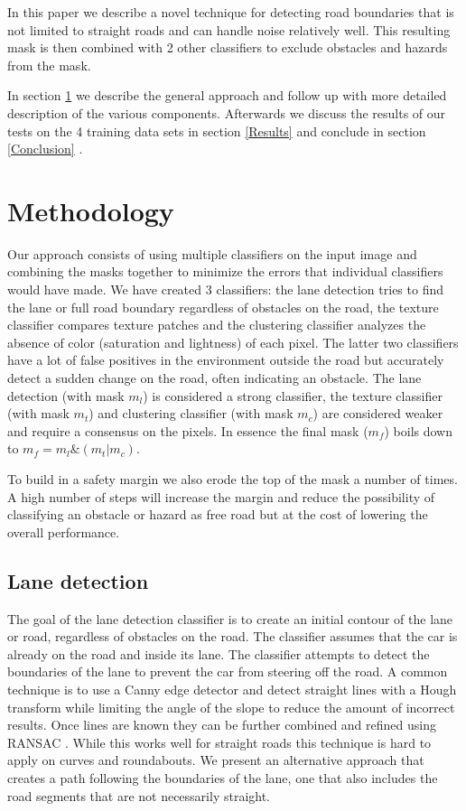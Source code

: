 \documentclass[oneside,english]{llncs}
\begin{document}
In this paper we describe a novel technique for detecting road boundaries that is not limited to straight roads and can handle noise relatively well. This resulting mask is then combined with 2 other classifiers to exclude obstacles and hazards from the mask.

In section \ref{Methodology}  we describe the general approach and follow up with more detailed description of the various components. Afterwards we discuss the results of our tests on the 4 training data sets in section \ref{Results}  and conclude in section \ref{Conclusion} .

\section{Methodology}\label{Methodology}

Our approach consists of using multiple classifiers on the input image and combining the masks together to minimize the errors that individual classifiers would have made. We have created 3 classifiers: the lane detection tries to find the lane or full road boundary regardless of obstacles on the road, the texture classifier compares texture patches and the clustering classifier analyzes the absence of color (saturation and lightness) of each pixel. The latter two classifiers have a lot of false positives in the environment outside the road but accurately detect a sudden change on the road, often indicating an obstacle. The lane detection (with mask $m_{l}$) is considered a strong classifier, the texture classifier (with mask $m_{t}$) and clustering classifier (with mask $m_{c}$) are considered weaker and require a consensus on the pixels. In essence the final mask ($m_{f}$) boils down to $m_{f}=m_{l}\&(m_{t}|m_{c})$.

To build in a safety margin we also erode the top of the mask a number of times. A high number of steps will increase the margin and reduce the possibility of classifying an obstacle or hazard as free road but at the cost of lowering the  overall performance.

\subsection{Lane detection}

The goal of the lane detection classifier is to create an initial contour of the lane or road, regardless of obstacles on the road. The classifier assumes that the car is already on the road and inside its lane. The classifier attempts to detect the boundaries of the lane to prevent the car from steering off the road. A common technique is to use a Canny edge detector and detect straight lines with a Hough transform while limiting the angle of the slope to reduce the amount of incorrect results\cite{key-9}\cite{key-15}. Once lines are known they can be further combined and refined using RANSAC \cite{key-10}. While this works well for straight roads this technique is hard to apply on curves and roundabouts. We present an alternative approach that creates a path following the boundaries of the lane, one that also includes the road segments that are not necessarily straight.
\end{document}
